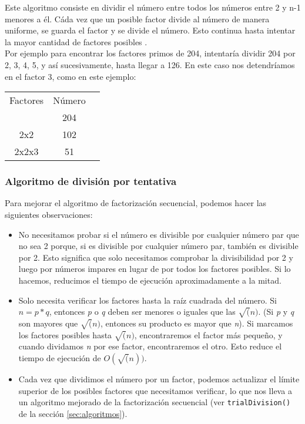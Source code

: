 \documentclass{article}
\begin{document}
Este algoritmo consiste en dividir el número entre todos los números entre 2 y
n-1 menores a él. Cáda vez que un posible factor divide al número de manera
uniforme, se guarda el factor y se divide el número. Esto continua hasta
intentar la mayor cantidad de factores posibles \cite{stephens2019essential}.\\

Por ejemplo para encontrar los factores primos de 204, intentaría dividir 204
por 2, 3, 4, 5, y así sucesivamente, hasta llegar a 126. En este caso nos
detendríamos en el factor 3, como en este ejemplo:

\begin{center}
    \begin{tabular}{ c c c }
     Factores & Número \\ 
              & 204    \\
     2x2      & 102    \\
     2x2x3    & 51
    \end{tabular}
    \end{center}

\subsubsection{Algoritmo de división por tentativa}

Para mejorar el algoritmo de factorización secuencial, podemos hacer las
siguientes observaciones:

\begin{itemize}
    \item No necesitamos probar si el número es divisible por cualquier número par que
    no sea 2 porque, si es divisible por cualquier número par, también es divisible
    por 2. Esto significa que solo necesitamos comprobar la divisibilidad por 2 y luego
    por números impares en lugar de por todos los factores posibles. Si lo hacemos,
    reducimos el tiempo de ejecución aproximadamente a la mitad.

    \item Solo necesita verificar los factores hasta la raíz cuadrada del número. Si
    $ n= p*q $, entonces \textit{p}  o \textit{q} deben ser menores o iguales
    que las $\sqrt(n)$. (Si \textit{p}  y \textit{q} son mayores que $\sqrt(n)$,
    entonces su producto es mayor que \textit{n}). Si marcamos los factores posibles
    hasta $\sqrt(n)$, encontraremos el factor más pequeño, y cuando dividamos
    \textit{n} por ese factor, encontraremos el otro. Esto reduce el tiempo de
    ejecución de $O(\sqrt(n))$.

    \item Cada vez que dividimos el número por un factor, podemos actualizar el
    límite superior de los posibles factores que necesitamos verificar, lo que nos
    lleva a un algoritmo mejorado de la factorización secuencial (ver
    \texttt{trialDivision()} de la sección \ref{sec:algoritmos}).

\end{itemize}
\end{document}
